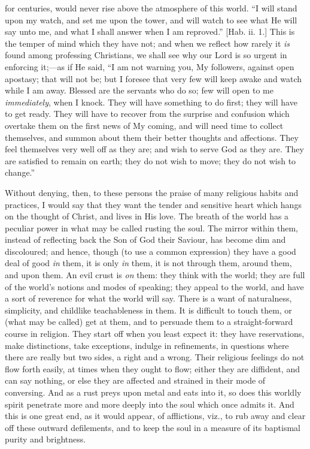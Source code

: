 for centuries, would never rise above the atmosphere of this world.
``I will stand upon my watch, and set me upon the tower, and will
watch to see what He will say unto me, and what I shall answer when I
am reproved.'' [Hab. ii. 1.] This is the temper of mind which they
have not; and when we reflect how rarely it \emph{is} found among
professing Christians, we shall see why our Lord is so urgent in
enforcing it;—as if He said, ``I am not warning you, My
followers, against open apostasy; that will not be; but I foresee that
very few will keep awake and watch while I am away. Blessed are the
servants who do so; few will open to me \emph{immediately}, when I
knock. They will have something to do first; they will have to get
ready. They will have to recover from the surprise and confusion which
overtake them on the first news of My coming, and will need time to
collect themselves, and summon about them their better thoughts and
affections. They feel themselves very well off as they are; and wish
to serve God as they are. They are satisfied to remain on earth; they
do not wish to move; they do not wish to change.''

Without denying, then, to these persons the praise of many
religious habits and practices, I would say that they want the tender
and sensitive heart which hangs on the thought of Christ, and lives in
His love. The breath of the world has a peculiar power in what may be
called rusting the soul. The mirror within them, instead of reflecting
back the Son of God their Saviour, has become dim and discoloured; and
hence, though (to use a common expression) they have a good deal of
good \emph{in} them, it is only \emph{in} them, it is not through
them, around them, and upon them. An evil crust is \emph{on} them:
they think with the world; they are full of the world's notions and
modes of speaking; they appeal to the world, and have a sort of
reverence for what the world will say. There is a want of naturalness,
simplicity, and childlike teachableness in them. It is difficult to
touch them, or (what may be called) get at them, and to persuade them
to a straight-forward course in religion. They start off when you
least expect it: they have reservations, make distinctions, take
exceptions, indulge in refinements, in questions where there are
really but two sides, a right and a wrong. Their religious feelings do
not flow forth easily, at times when they ought to flow; either they
are diffident, and can say nothing, or else they are affected and
strained in their mode of conversing. And as a rust preys upon metal
and eats into it, so does this worldly spirit penetrate more and more
deeply into the soul which once admits it. And this is one great end,
as it would appear, of afflictions, viz., to rub away and clear off
these outward defilements, and to keep the soul in a measure of its
baptismal purity and brightness.

